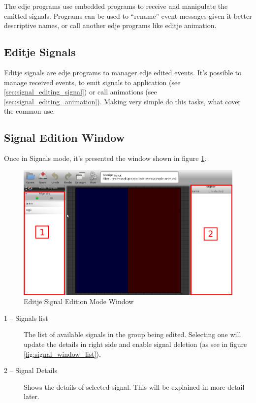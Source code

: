 \documentclass[a4paper]{profusion}
\begin{document}
The edje programs use embedded programs to receive and manipulate the
emitted signals. Programs can be used to ``rename'' event messages
given it better descriptive names, or call another edje programs like
editje animation.

\subsection{Editje Signals}

Editje signals are edje programs to manager edje edited events. It's
possible to manage received events, to emit signals to application
(see \ref{sec:signal_editing_signal}) or call animations (see
\ref{sec:signal_editing_animation}). Making very simple do this tasks,
what cover the common use.

\subsection{Signal Edition Window}

Once in Signals mode, it's presented the window shown in figure
\ref{fig:signal_window}.

\begin{figure}
 \centering
 \includegraphics[width=1.0\textwidth]{./images/signal_win.png}
 \caption{Editje Signal Edition Mode Window}
 \label{fig:signal_window}
\end{figure}

\begin{description}
\item[1 -- Signals list] The list of available signals in the group
  being edited. Selecting one will update the details in right side
  and enable signal deletion (as see in figure
  \ref{fig:signal_window_list}).
\item[2 -- Signal Details] Shows the details of selected signal. This
  will be explained in more detail later.
\end{description}
\end{document}
